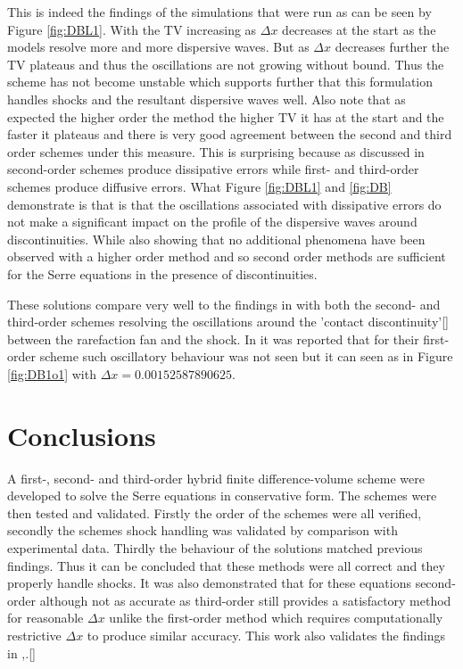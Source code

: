 \documentclass[SingleSpace,12pt]{Serre_ASCE}
\begin{document}
This is indeed the findings of the simulations that were run as can be seen by Figure \ref{fig:DBL1}. With the TV increasing as $\Delta x$ decreases at the start as the models resolve more and more dispersive waves. But as $\Delta x$ decreases further the TV plateaus and thus the oscillations are not growing without bound. Thus the scheme has not become unstable which supports further that this formulation handles shocks and the resultant dispersive waves well. Also note that as expected the higher order the method the higher TV it has at the start and the faster it plateaus and there is very good agreement between the second and third order schemes under this measure. This is surprising because as discussed in \cite{Zoppou-Roberts-1996} second-order schemes produce dissipative errors while first- and third-order schemes produce diffusive errors. What Figure \ref{fig:DBL1} and \ref{fig:DB} demonstrate is that is that the oscillations associated with dissipative errors do not make a significant impact on the profile of the dispersive waves around discontinuities. While also showing that no additional phenomena have been observed with a higher order method and so second order methods are sufficient for the Serre equations in the presence of discontinuities. 

These solutions compare very well to the findings in \cite{El-etal-2006} with both the second- and third-order schemes resolving the oscillations around the 'contact discontinuity'\cite{El-etal-2006}[] between the rarefaction fan and the shock. In \cite{Hank-etal-2010-2034} it was reported that for their first-order scheme such oscillatory behaviour was not seen but it can seen as in Figure \ref{fig:DB1o1} with $\Delta x = 0.00152587890625$.
\section{Conclusions}
\label{section:Conclusions}
A first-, second- and third-order hybrid finite difference-volume scheme were developed to solve the Serre equations in conservative form. The schemes were then tested and validated. Firstly the order of the schemes were all verified, secondly the schemes shock handling was validated by comparison with experimental data. Thirdly the behaviour of the solutions matched previous findings. Thus it can be concluded that these methods were all correct and they properly handle shocks. It was also demonstrated that for these equations second-order although not as accurate as third-order still provides a satisfactory method for reasonable $\Delta x$ unlike the first-order method which requires computationally restrictive $\Delta x$ to produce similar accuracy. This work also validates the findings in \cite{El-etal-2006},.[]  
\end{document}
